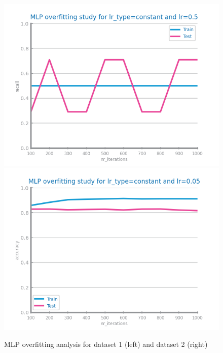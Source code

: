\documentclass[10pt]{extarticle}
\begin{document}
\begin{figure}[H]
\centering\includegraphics[scale=0.95]{images/dataset1/models_evaluation/CovidPos_mlp_recall_overfitting.png}
\includegraphics[scale=0.95]{images/dataset2/models_evaluation/Credit_Score_mlp_accuracy_overfitting.png}
\caption{MLP overfitting analysis for dataset 1 (left) and dataset 2 (right)}
\end{figure}
\end{document}

